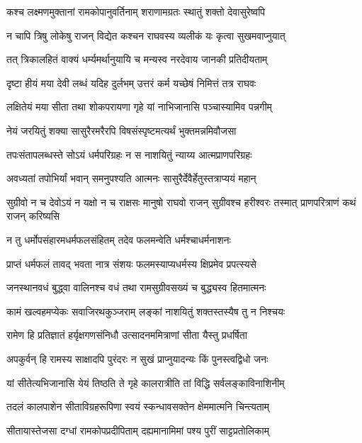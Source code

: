 \twolineshloka
{कश्च लक्ष्मणमुक्तानां रामकोपानुवर्तिनाम्}
{शराणामग्रतः स्थातुं शक्तो देवासुरेष्वपि} %

\twolineshloka
{न चापि त्रिषु लोकेषु राजन् विद्येत कश्चन}
{राघवस्य व्यलीकं यः कृत्वा सुखमवाप्नुयात्} %

\twolineshloka
{तत् त्रिकालहितं वाक्यं धर्म्यमर्थानुयायि च}
{मन्यस्व नरदेवाय जानकी प्रतिदीयताम्} %

\twolineshloka
{दृष्टा हीयं मया देवी लब्धं यदिह दुर्लभम्}
{उत्तरं कर्म यच्छेषं निमित्तं तत्र राघवः} %

\twolineshloka
{लक्षितेयं मया सीता तथा शोकपरायणा}
{गृहे यां नाभिजानासि पञ्चास्यामिव पन्नगीम्} %

\twolineshloka
{नेयं जरयितुं शक्या सासुरैरमरैरपि}
{विषसंस्पृष्टमत्यर्थं भुक्तमन्नमिवौजसा} %

\twolineshloka
{तपःसंतापलब्धस्ते सोऽयं धर्मपरिग्रहः}
{न स नाशयितुं न्याय्य आत्मप्राणपरिग्रहः} %

\twolineshloka
{अवध्यतां तपोभिर्यां भवान् समनुपश्यति}
{आत्मनः सासुरैर्देवैर्हेतुस्तत्राप्ययं महान्} %

\threelineshloka
{सुग्रीवो न च देवोऽयं न यक्षो न च राक्षसः}
{मानुषो राघवो राजन् सुग्रीवश्च हरीश्वरः}
{तस्मात् प्राणपरित्राणं कथं राजन् करिष्यसि} %

\twolineshloka
{न तु धर्मोपसंहारमधर्मफलसंहितम्}
{तदेव फलमन्वेति धर्मश्चाधर्मनाशनः} %

\twolineshloka
{प्राप्तं धर्मफलं तावद् भवता नात्र संशयः}
{फलमस्याप्यधर्मस्य क्षिप्रमेव प्रपत्स्यसे} %

\twolineshloka
{जनस्थानवधं बुद्ध्वा वालिनश्च वधं तथा}
{रामसुग्रीवसख्यं च बुद्ध्यस्व हितमात्मनः} %

\twolineshloka
{कामं खल्वहमप्येकः सवाजिरथकुञ्जराम्}
{लङ्कां नाशयितुं शक्तस्तस्यैष तु न निश्चयः} %

\twolineshloka
{रामेण हि प्रतिज्ञातं हर्यृक्षगणसंनिधौ}
{उत्सादनममित्राणां सीता यैस्तु प्रधर्षिता} %

\twolineshloka
{अपकुर्वन् हि रामस्य साक्षादपि पुरंदरः}
{न सुखं प्राप्नुयादन्यः किं पुनस्त्वद्विधो जनः} %

\twolineshloka
{यां सीतेत्यभिजानासि येयं तिष्ठति ते गृहे}
{कालरात्रीति तां विद्धि सर्वलङ्काविनाशिनीम्} %

\twolineshloka
{तदलं कालपाशेन सीताविग्रहरूपिणा}
{स्वयं स्कन्धावसक्तेन क्षेममात्मनि चिन्त्यताम्} %

\twolineshloka
{सीतायास्तेजसा दग्धां रामकोपप्रदीपिताम्}
{दह्यमानामिमां पश्य पुरीं साट्टप्रतोलिकाम्} %

